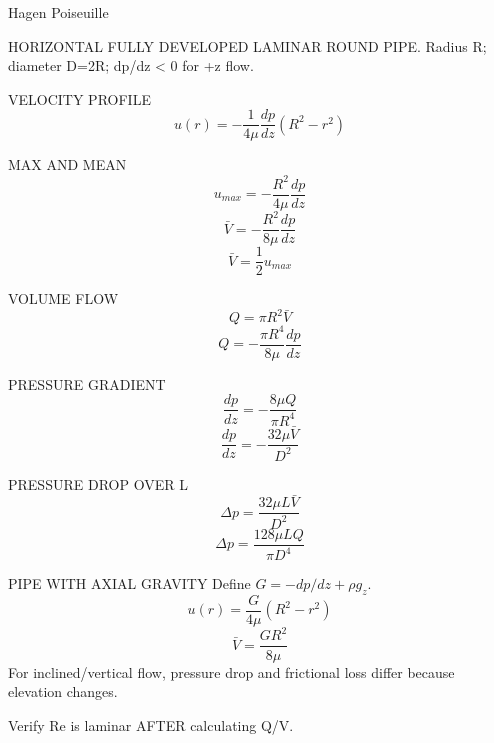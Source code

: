 Hagen Poiseuille

HORIZONTAL FULLY DEVELOPED LAMINAR ROUND PIPE.
Radius R; diameter D=2R; dp/dz < 0 for +z flow.

VELOCITY PROFILE
$$u(r)=-\frac{1}{4\mu}\frac{dp}{dz}(R^2-r^2)$$

MAX AND MEAN
$$u_{max}=-\frac{R^2}{4\mu}\frac{dp}{dz}$$
$$\bar V=-\frac{R^2}{8\mu}\frac{dp}{dz}$$
$$\bar V=\frac{1}{2}u_{max}$$

VOLUME FLOW
$$Q=\pi R^2\bar V$$
$$Q=-\frac{\pi R^4}{8\mu}\frac{dp}{dz}$$

PRESSURE GRADIENT
$$\frac{dp}{dz}=-\frac{8\mu Q}{\pi R^4}$$
$$\frac{dp}{dz}=-\frac{32\mu\bar V}{D^2}$$

PRESSURE DROP OVER L
$$\Delta p=\frac{32\mu L\bar V}{D^2}$$
$$\Delta p=\frac{128\mu LQ}{\pi D^4}$$

PIPE WITH AXIAL GRAVITY
Define $G=-dp/dz+\rho g_z$.
$$u(r)=\frac{G}{4\mu}(R^2-r^2)$$
$$\bar V=\frac{GR^2}{8\mu}$$
For inclined/vertical flow, pressure drop and frictional loss differ because elevation changes.

Verify Re is laminar AFTER calculating Q/V.
